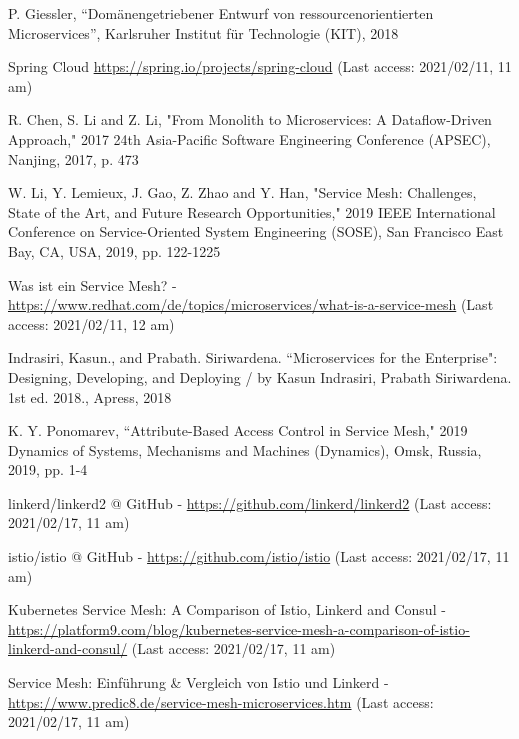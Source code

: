 \begin{thebibliography}{00}

 P. Giessler, ``Dom\"anengetriebener Entwurf von ressourcenorientierten Microservices'', Karlsruher Institut für Technologie (KIT), 2018

Spring Cloud \url{https://spring.io/projects/spring-cloud} (Last access: 2021/02/11, 11 am)

 R. Chen, S. Li and Z. Li, "From Monolith to Microservices: A Dataflow-Driven Approach," 2017 24th Asia-Pacific Software Engineering Conference (APSEC), Nanjing, 2017, p. 473

 W. Li, Y. Lemieux, J. Gao, Z. Zhao and Y. Han, "Service Mesh: Challenges, State of the Art, and Future Research Opportunities," 2019 IEEE International Conference on Service-Oriented System Engineering (SOSE), San Francisco East Bay, CA, USA, 2019, pp. 122-1225

 Was ist ein Service Mesh? - \url{https://www.redhat.com/de/topics/microservices/what-is-a-service-mesh} (Last access: 2021/02/11, 12 am)

 Indrasiri, Kasun., and Prabath. Siriwardena. ``Microservices for the Enterprise": Designing, Developing, and Deploying / by Kasun Indrasiri, Prabath Siriwardena. 1st ed. 2018., Apress, 2018

K. Y. Ponomarev, ``Attribute-Based Access Control in Service Mesh," 2019 Dynamics of Systems, Mechanisms and Machines (Dynamics), Omsk, Russia, 2019, pp. 1-4

 linkerd/linkerd2 @ GitHub - \url{https://github.com/linkerd/linkerd2} (Last access: 2021/02/17, 11 am)

 istio/istio @ GitHub - \url{https://github.com/istio/istio} (Last access: 2021/02/17, 11 am)

 Kubernetes Service Mesh: A Comparison of Istio, Linkerd and Consul - \url{https://platform9.com/blog/kubernetes-service-mesh-a-comparison-of-istio-linkerd-and-consul/} (Last access: 2021/02/17, 11 am)

 Service Mesh: Einführung \& Vergleich von Istio und Linkerd - \url{https://www.predic8.de/service-mesh-microservices.htm}  (Last access: 2021/02/17, 11 am)

\end{thebibliography}